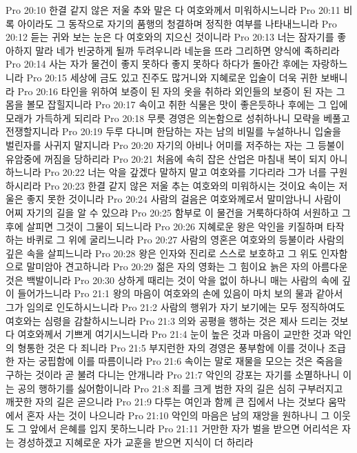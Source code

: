 Pro 20:10  한결 같지 않은 저울 추와 말은 다 여호와께서 미워하시느니라
Pro 20:11  비록 아이라도 그 동작으로 자기의 품행의 청결하며 정직한 여부를 나타내느니라
Pro 20:12  듣는 귀와 보는 눈은 다 여호와의 지으신 것이니라
Pro 20:13  너는 잠자기를 좋아하지 말라 네가 빈궁하게 될까 두려우니라 네눈을 뜨라 그리하면 양식에 족하리라
Pro 20:14  사는 자가 물건이 좋지 못하다 좋지 못하다 하다가 돌아간 후에는 자랑하느니라
Pro 20:15  세상에 금도 있고 진주도 많거니와 지혜로운 입술이 더욱 귀한 보배니라
Pro 20:16  타인을 위하여 보증이 된 자의 옷을 취하라 외인들의 보증이 된 자는 그 몸을 볼모 잡힐지니라
Pro 20:17  속이고 취한 식물은 맛이 좋은듯하나 후에는 그 입에 모래가 가득하게 되리라
Pro 20:18  무릇 경영은 의논함으로 성취하나니 모략을 베풀고 전쟁할지니라
Pro 20:19  두루 다니며 한담하는 자는 남의 비밀를 누설하나니 입술을 벌린자를 사귀지 말지니라
Pro 20:20  자기의 아비나 어미를 저주하는 자는 그 등불이 유암중에 꺼짐을 당하리라
Pro 20:21  처음에 속히 잡은 산업은 마침내 복이 되지 아니하느니라
Pro 20:22  너는 악을 갚겠다 말하지 말고 여호와를 기다리라 그가 너를 구원하시리라
Pro 20:23  한결 같지 않은 저울 추는 여호와의 미워하시는 것이요 속이는 저울은 좋지 못한 것이니라
Pro 20:24  사람의 걸음은 여호와께로서 말미암나니 사람이 어찌 자기의 길을 알 수 있으랴
Pro 20:25  함부로 이 물건을 거룩하다하여 서원하고 그 후에 살피면 그것이 그물이 되느니라
Pro 20:26  지혜로운 왕은 악인을 키질하며 타작하는 바퀴로 그 위에 굴리느니라
Pro 20:27  사람의 영혼은 여호와의 등불이라 사람의 깊은 속을 살피느니라
Pro 20:28  왕은 인자와 진리로 스스로 보호하고 그 위도 인자함으로 말미암아 견고하니라
Pro 20:29  젊은 자의 영화는 그 힘이요 늙은 자의 아름다운 것은 백발이니라
Pro 20:30  상하게 때리는 것이 악을 없이 하나니 매는 사람의 속에 깊이 들어가느니라
Pro 21:1  왕의 마음이 여호와의 손에 있음이 마치 보의 물과 같아서 그가 임의로 인도하시느니라
Pro 21:2  사람의 행위가 자기 보기에는 모두 정직하여도 여호와는 심령을 감찰하시느니라
Pro 21:3  의와 공평을 행하는 것은 제사 드리는 것보다 여호와께서 기쁘게 여기시느니라
Pro 21:4  눈이 높은 것과 마음이 교만한 것과 악인의 형통한 것은 다 죄니라
Pro 21:5  부지런한 자의 경영은 풍부함에 이를 것이나 조급한 자는 궁핍함에 이를 따름이니라
Pro 21:6  속이는 말로 재물을 모으는 것은 죽음을 구하는 것이라 곧 불려 다니는 안개니라
Pro 21:7  악인의 강포는 자기를 소멸하나니 이는 공의 행하기를 싫어함이니라
Pro 21:8  죄를 크게 범한 자의 길은 심히 구부러지고 깨끗한 자의 길은 곧으니라
Pro 21:9  다투는 여인과 함께 큰 집에서 나는 것보다 움막에서 혼자 사는 것이 나으니라
Pro 21:10  악인의 마음은 남의 재앙을 원하나니 그 이웃도 그 앞에서 은혜를 입지 못하느니라
Pro 21:11  거만한 자가 벌을 받으면 어리석은 자는 경성하겠고 지혜로운 자가 교훈을 받으면 지식이 더 하리라
